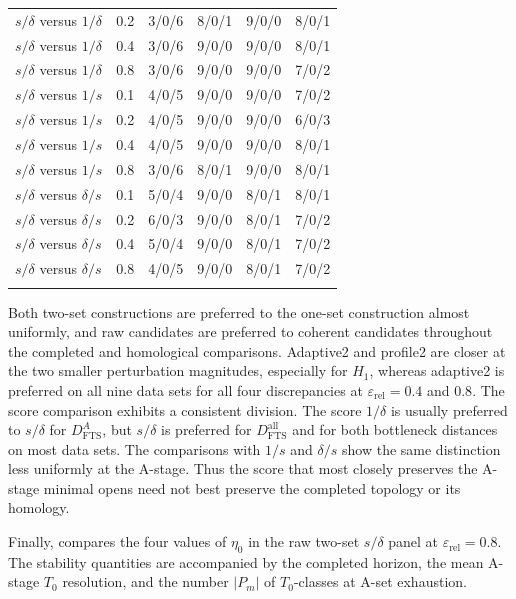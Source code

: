 \documentclass[a4paper,11pt]{article}
\theoremstyle{definition}
\theoremstyle{remark}
\begin{document}
\begin{table}[!ht]
\begin{tabular}{lccccc}
$s/\delta$ versus $1/\delta$ & 0.2 & 3/0/6 & 8/0/1 & 9/0/0 & 8/0/1 \\
$s/\delta$ versus $1/\delta$ & 0.4 & 3/0/6 & 9/0/0 & 9/0/0 & 8/0/1 \\
$s/\delta$ versus $1/\delta$ & 0.8 & 3/0/6 & 9/0/0 & 9/0/0 & 7/0/2 \\
\addlinespace
$s/\delta$ versus $1/s$ & 0.1 & 4/0/5 & 9/0/0 & 9/0/0 & 7/0/2 \\
$s/\delta$ versus $1/s$ & 0.2 & 4/0/5 & 9/0/0 & 9/0/0 & 6/0/3 \\
$s/\delta$ versus $1/s$ & 0.4 & 4/0/5 & 9/0/0 & 9/0/0 & 8/0/1 \\
$s/\delta$ versus $1/s$ & 0.8 & 3/0/6 & 8/0/1 & 9/0/0 & 8/0/1 \\
\addlinespace
$s/\delta$ versus $\delta/s$ & 0.1 & 5/0/4 & 9/0/0 & 8/0/1 & 8/0/1 \\
$s/\delta$ versus $\delta/s$ & 0.2 & 6/0/3 & 9/0/0 & 8/0/1 & 7/0/2 \\
$s/\delta$ versus $\delta/s$ & 0.4 & 5/0/4 & 9/0/0 & 8/0/1 & 7/0/2 \\
$s/\delta$ versus $\delta/s$ & 0.8 & 4/0/5 & 9/0/0 & 8/0/1 & 7/0/2 \\
\addlinespace
\bottomrule
\end{tabular}
\end{table}

Both two-set constructions are preferred to the one-set construction almost uniformly, and raw candidates are preferred to coherent candidates throughout the completed and homological comparisons. Adaptive2 and profile2 are closer at the two smaller perturbation magnitudes, especially for $H_1$, whereas adaptive2 is preferred on all nine data sets for all four discrepancies at $\varepsilon_{\mathrm{rel}}=0.4$ and $0.8$. The score comparison exhibits a consistent division. The score $1/\delta$ is usually preferred to $s/\delta$ for $D_{\mathrm{FTS}}^A$, but $s/\delta$ is preferred for $D_{\mathrm{FTS}}^{\mathrm{all}}$ and for both bottleneck distances on most data sets. The comparisons with $1/s$ and $\delta/s$ show the same distinction less uniformly at the A-stage. Thus the score that most closely preserves the A-stage minimal opens need not best preserve the completed topology or its homology.

Finally,  compares the four values of $\eta_0$ in the raw two-set $s/\delta$ panel at $\varepsilon_{\mathrm{rel}}=0.8$. The stability quantities are accompanied by the completed horizon, the mean A-stage $T_0$ resolution, and the number $|P_m|$ of $T_0$-classes at A-set exhaustion.
\end{document}
